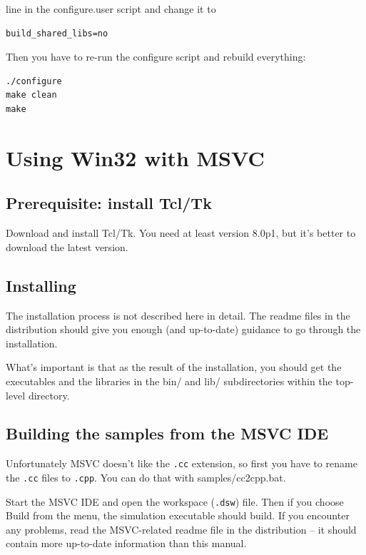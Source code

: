 line in the configure.user script and change it to

\begin{Verbatim}
build_shared_libs=no
\end{Verbatim}

Then you have to re-run the configure script and rebuild everything:

\begin{Verbatim}
./configure
make clean
make
\end{Verbatim}



\section{Using Win32 with MSVC}

\subsection{Prerequisite: install Tcl/Tk}

Download and install Tcl/Tk. You need at least version 8.0p1, 
but it's better to download the latest version.





\subsection{Installing {\opp}}

The installation process is not described here in detail. The 
readme files in the distribution should give you enough (and 
up-to-date) guidance to go through the installation.

What's important is that as the result of the installation, you 
should get the executables and the libraries in the bin/ and lib/ 
subdirectories within the top-level {\opp} directory.





\subsection{Building the samples from the MSVC IDE}

Unfortunately MSVC doesn't like the \texttt{.cc} extension, so first
you have to rename the \texttt{.cc} files to \texttt{.cpp}. You can do
that with samples/cc2cpp.bat.


Start the MSVC IDE and open the workspace (\texttt{.dsw}) file. Then
if you choose Build from the menu, the simulation executable should
build. If you encounter any problems, read the MSVC-related readme
file in the distribution -- it should contain more up-to-date
information than this manual.

